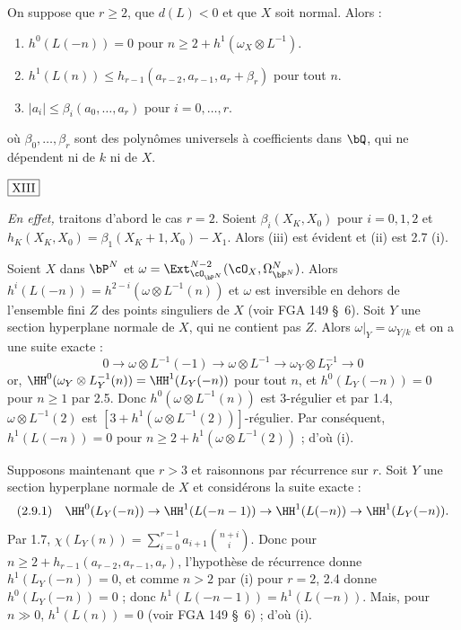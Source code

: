 \begin{lem}\label{lem:2.9} On suppose que $r \geq 2$, que $d(L) < 0$ et que $X$ soit normal. Alors :
\begin{enumerate}[label={\roman*)}]
\item $h^0(L(-n)) = 0$ pour $n \geq 2 + h^1(\omega_X \otimes L^{-1})$.
\item $h^1(L(n)) \leq h_{r-1}(a_{r-2}, a_{r-1}, a_r + \beta_r)$ pour tout $n$.
\item $|a_i| \leq \beta_i(a_0, \ldots, a_r)$ pour $i = 0, \ldots, r$.
\end{enumerate}
où $\beta_0, \ldots, \beta_r$ sont des polynômes universels à coefficients dans $\bQ$, qui ne dépendent ni de $k$ ni de $X$.
\end{lem}

\begin{flushright}
$\fbox{\text{XIII}}$
\end{flushright}

\noindent\textit{En effet,} traitons d'abord le cas $r=2$. Soient $\beta_i(X_K, X_0)$ pour $i=0,1,2$ et $h_K(X_K, X_0) = \beta_1(X_K+1, X_0) - X_1$. Alors (iii) est évident et (ii) est 2.7 (i).

Soient $X$ dans $\bP^N$ et $\omega = \Ext_{\cO_{\bP^N}}^{N-2}(\cO_X, \Omega_{\bP^N}^N)$. Alors $h^i(L(-n)) = h^{2-i}(\omega \otimes L^{-1}(n))$ et $\omega$ est inversible en dehors de l'ensemble fini $Z$ des points singuliers de $X$ (voir FGA 149 \S\ 6). Soit $Y$ une section hyperplane normale de $X$, qui ne contient pas $Z$. Alors $\omega|_Y = \omega_{Y/k}$ et on a une suite exacte :
\[
0 \to \omega \otimes L^{-1}(-1) \to \omega \otimes L^{-1} \to \omega_Y \otimes L_Y^{-1} \to 0
\]
or, $\HH^0(\omega_Y \otimes L_Y^{-1}(n)) = \HH^1(L_Y(-n))$ pour tout $n$, et $h^0(L_Y(-n)) = 0$ pour $n \geq 1$ par 2.5. Donc $h^0(\omega \otimes L^{-1}(n))$ est $3$-régulier et par 1.4, $\omega \otimes L^{-1}(2)$ est $[3 + h^1(\omega \otimes L^{-1}(2))]$-régulier. Par conséquent, $h^1(L(-n)) = 0$ pour $n \geq 2 + h^1(\omega \otimes L^{-1}(2))$ ; d'où (i).

Supposons maintenant que $r > 3$ et raisonnons par récurrence sur $r$. Soit $Y$ une section hyperplane normale de $X$ et considérons la suite exacte :
\[
\text{(2.9.1)} \quad \HH^0(L_Y(-n)) \to \HH^1(L(-n-1)) \to \HH^1(L(-n)) \to \HH^1(L_Y(-n)).
\]
Par 1.7, $\chi(L_Y(n)) = \sum_{i=0}^{r-1} a_{i+1} \binom{n+i}{i}$. Donc pour $n \geq 2 + h_{r-1}(a_{r-2}, a_{r-1}, a_r)$, l'hypothèse de récurrence donne $h^1(L_Y(-n)) = 0$, et comme $n > 2$ par (i) pour $r=2$, 2.4 donne $h^0(L_Y(-n)) = 0$ ; donc $h^1(L(-n-1)) = h^1(L(-n))$. Mais, pour $n \gg 0$, $h^1(L(n)) = 0$ (voir FGA 149 \S\ 6) ; d'où (i).

